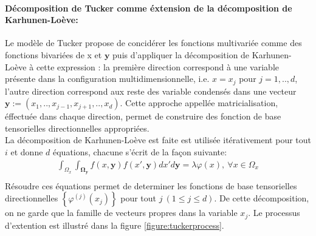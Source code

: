 \paragraph{Décomposition de Tucker comme éxtension de la décomposition de Karhunen-Loève:\\}
\hspace{0.5cm} Le modèle de Tucker propose de concidérer les fonctions multivariée comme des fonctions bivariées de x et $\mathbf{y}$ puis d'appliquer la
décomposition de Karhunen-Loève à cette expression : la première direction correspond à une variable présente dans la configuration multidimensionnelle, i.e. $x=x_j$ pour $j=1,..,d$,
l'autre direction correspond aux reste des variable condensés dans une vecteur $\mathbf{y}:=(x_1,..,x_{j-1}, x_{j+1}, .., x_d)$. Cette approche appellée matricialisation, éffectuée dans chaque direction, permet
de construire des fonction de base tensorielles directionnelles appropriées.\\
La décomposition de Karhunen-Loève est faite est utilisée itérativement pour tout $i$ et donne $d$ équations, chacune s'écrit de la façon suivante:
\begin{align}
		\int_{\Omega_{x}} \int_{\mathbf{\Omega_{y}}} f(x,\mathbf{y}) f(x',\mathbf{y})dx'd\mathbf{y} = \lambda \varphi(x),\ \forall x \in \Omega_x	 \\
\end{align}
\hspace{0.5cm} Résoudre ces équations permet de determiner les fonctions de base tensorielles directionnelles $\left \{ \varphi^{(j)}(x_j) \right \}$ pour tout
$j\ (1 \leq j \leq d)$. De cette décomposition, on ne garde que la famille de vecteurs propres dans la variable $x_j$. Le processus d'extention est illustré dans la figure \ref{figure:tuckerprocess}.
